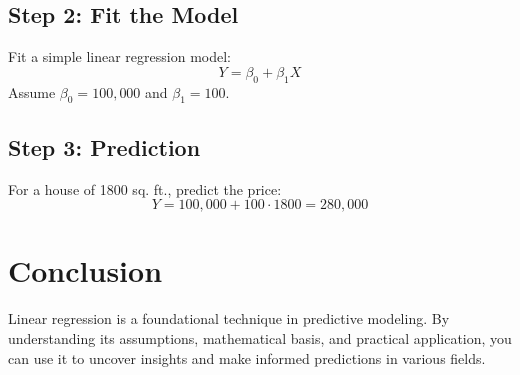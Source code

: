 \documentclass[a4paper,12pt]{article}
\begin{document}
\subsection{Step 2: Fit the Model}
Fit a simple linear regression model:
\[
Y = \beta_0 + \beta_1 X
\]
Assume $\beta_0 = 100,000$ and $\beta_1 = 100$.

\subsection{Step 3: Prediction}
For a house of 1800 sq. ft., predict the price:
\[
Y = 100,000 + 100 \cdot 1800 = 280,000
\]

\section{Conclusion}
Linear regression is a foundational technique in predictive modeling. By understanding its assumptions, mathematical basis, and practical application, you can use it to uncover insights and make informed predictions in various fields.
\end{document}
